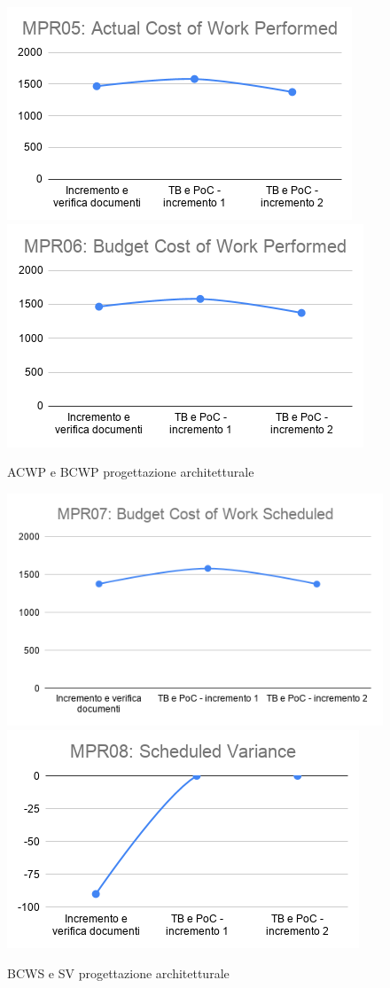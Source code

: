 \begin{figure}[h!]
	\includegraphics[scale=0.6]{Immagini/ACWP_PArchitetturale.png}\quad
	\includegraphics[scale=0.6]{Immagini/BCWP_PArchitetturale.png}
	\caption{ACWP e BCWP progettazione architetturale}
	\label{fig:BCWP_PArchitetturale}
\end{figure}
\begin{figure}[h!]
	\includegraphics[scale=0.5]{Immagini/BCWS_PArchitetturale.png}\quad
 	\includegraphics[scale=0.6]{Immagini/SV_PArchitetturale.png}
 	\caption{BCWS e SV progettazione architetturale}
 	\label{fig:SV_PArchitetturale}
\end{figure}
